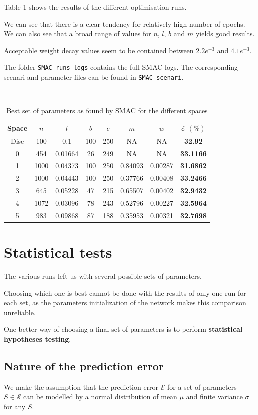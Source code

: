 \documentclass[10pt,a4paper, twocolumn]{article}
\theoremstyle{definition}
\begin{document}
Table 1 shows the results of the different optimisation runs.

We can see that there is a clear tendency for relatively high number of epochs. We can also see that a broad range of values for $n$, $l$, $b$ and $m$ yields good results.

Acceptable weight decay values seem to be contained between $2.2e^{-3}$ and $4.1e^{-3}$.

The folder \texttt{SMAC-runs\_logs} contains the full SMAC logs. The corresponding scenari and parameter files can be found in \texttt{SMAC\_scenari}.

\begin{table}
\
\centering
\resizebox{\columnwidth}{!} {
\begin{tabular}{|c|c|c|c|c|c|c|c|}
\hline
Space & $n$ & $l$ & $b$ & $e$ & $m$ & $w$ & $\mathcal{E} \; (\%)$\\
\hline
Disc & 100 & 0.1 & 100 & 250 & NA & NA & \textbf{32.92}\\
\hline
0 & 454 & 0.01664 & 26 & 249 & NA & NA & \textbf{33.1166}\\
\hline
1 & 1000 & 0.04373 & 100 & 250 & 0.84093 & 0.00287 & \textbf{31.6862}\\
\hline
2 & 1000 & 0.04443 & 100 & 250 & 0.37766 & 0.00408 & \textbf{33.2466}\\
\hline
3 & 645 & 0.05228 & 47 & 215 & 0.65507 & 0.00402 & \textbf{32.9432}\\
\hline
4 & 1072 & 0.03096 & 78 & 243 & 0.52796 & 0.00227 & \textbf{32.5964}\\
\hline
5 & 983 & 0.09868 & 87 & 188 & 0.35953 & 0.00321 & \textbf{32.7698}\\
\hline
\end{tabular}
}
\caption{Best set of parameters as found by SMAC for the different spaces}
\end{table}

\section{Statistical tests}
The various runs left us with several possible sets of parameters.

Choosing which one is best cannot be done with the results of only one run for each set, as the parameters initialization of the network makes this comparison unreliable.

One better way of choosing a final set of parameters is to perform \textbf{statistical hypotheses testing}.
\subsection{Nature of the prediction error}
We make the assumption that the prediction error $\mathcal{E}$ for a set of parameters $S \in \mathcal{S}$ can be modelled by a normal distribution of mean $\mu$ and finite variance $\sigma$ for any $S$.
\end{document}

